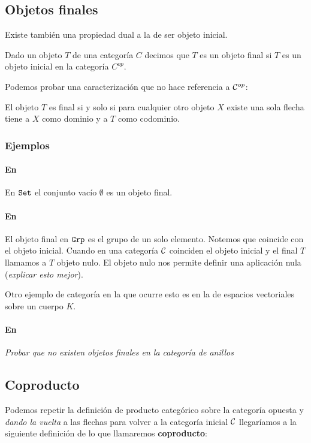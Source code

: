 \subsection{Objetos finales}
Existe también una propiedad dual a la de ser objeto inicial.

\begin{definition}
Dado un objeto $T$ de una categoría $C$ decimos que
$T$ es un objeto final si $T$ es un objeto inicial en la
categoría $C^{op}$.
\end{definition}

Podemos probar una caracterización que no hace referencia a
$\mathcal{C}^{op}$:

\begin{proposition}
El objeto $T$ es final si y solo si para cualquier otro objeto
$X$ existe una sola flecha tiene a $X$ como dominio y a $T$ como
codominio.
\end{proposition}

\subsubsection{Ejemplos}
\paragraph{En \Set}
En $\texttt{Set}$ el conjunto vacío $\emptyset$ es un objeto final.

\paragraph{En \Grp}

El objeto final en $\texttt{Grp}$ es el grupo de un solo elemento. Notemos
que coincide con el objeto inicial. Cuando en una categoría $\mathcal{C}$ coinciden
el objeto inicial y el final $T$ llamamos a $T$ objeto nulo. El objeto
nulo nos permite definir una aplicación nula (\textit{explicar esto mejor}).

Otro ejemplo de categoría en la que ocurre esto es en la de espacios vectoriales
sobre un cuerpo $K$.

\paragraph{En \Ring}
\textit{Probar que no existen objetos finales en la categoría de anillos}

\subsection{Coproducto}
Podemos repetir la definición de producto categórico sobre la categoría
opuesta y \textit{dando la vuelta} a las flechas para volver a la
categoría inicial $\mathcal{C}$ llegaríamos a la siguiente definición de lo que
llamaremos \textbf{coproducto}:

